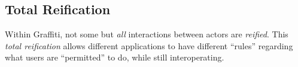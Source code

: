 \subsection{Total Reification}
\label{concepts:total-reification}

Within Graffiti, not some but \emph{all} interactions between actors
are \emph{reified}.
This \emph{total reification} allows different applications to have
different ``rules'' regarding what users are ``permitted'' to do, while
still interoperating.




